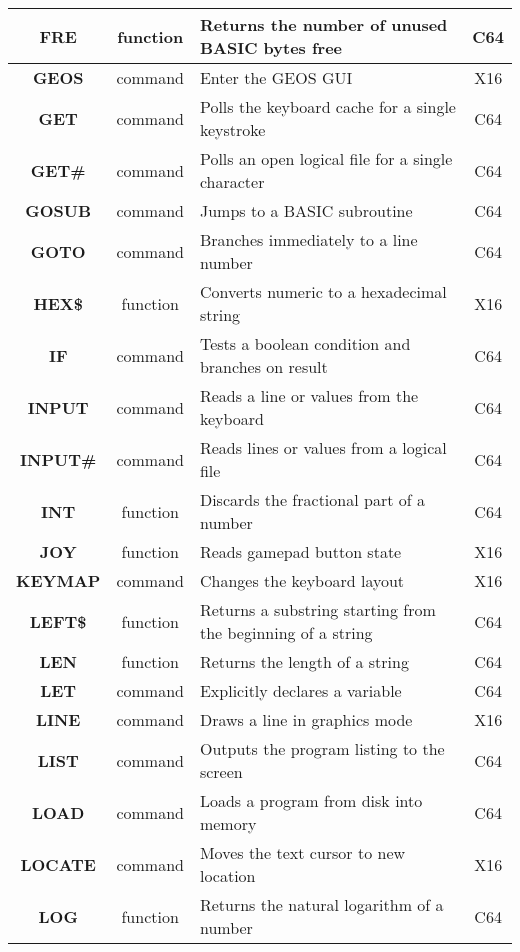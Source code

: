 \begin{longtable}{|c|c|m{4cm}|c|}
	{\bfseries FRE} & function & Returns the number of unused BASIC bytes free & C64 \\ \hline
	{\bfseries GEOS} & command & Enter the GEOS GUI & X16 \\ \hline
	{\bfseries GET} & command & Polls the keyboard cache for a single keystroke & C64 \\ \hline
	{\bfseries GET\#} & command & Polls an open logical file for a single character & C64 \\ \hline
	{\bfseries GOSUB} & command & Jumps to a BASIC subroutine & C64 \\ \hline
	{\bfseries GOTO} & command & Branches immediately to a line number & C64 \\ \hline
	{\bfseries HEX\$} & function & Converts numeric to a hexadecimal string & X16 \\ \hline
	{\bfseries IF} & command & Tests a boolean condition and branches on result & C64 \\ \hline
	{\bfseries INPUT} & command & Reads a line or values from the keyboard & C64 \\ \hline
	{\bfseries INPUT\#} & command & Reads lines or values from a logical file & C64 \\ \hline
	{\bfseries INT} & function & Discards the fractional part of a number & C64 \\ \hline
	{\bfseries JOY} & function & Reads gamepad button state & X16 \\ \hline
	{\bfseries KEYMAP} & command & Changes the keyboard layout & X16 \\ \hline
	{\bfseries LEFT\$} & function & Returns a substring starting from the beginning of a string & C64 \\ \hline
	{\bfseries LEN} & function & Returns the length of a string & C64 \\ \hline
	{\bfseries LET} & command & Explicitly declares a variable & C64 \\ \hline
	{\bfseries LINE} & command & Draws a line in graphics mode & X16 \\ \hline
	{\bfseries LIST} & command & Outputs the program listing to the screen & C64 \\ \hline
	{\bfseries LOAD} & command & Loads a program from disk into memory & C64 \\ \hline
	{\bfseries LOCATE} & command & Moves the text cursor to new location & X16 \\ \hline
	{\bfseries LOG} & function & Returns the natural logarithm of a number & C64 \\ \hline

\end{longtable}

